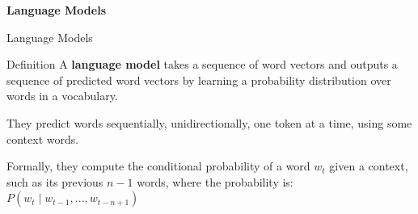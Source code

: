 
\begin{frame}{}
    \centering\large\textbf{Language Models}
\end{frame}




\begin{frame}{Language Models}
      \small 
    
    \begin{definitionBlock}{Definition}
    A \alert{\textbf{language model}} takes a sequence of word vectors and outputs a sequence of predicted word vectors by learning a probability distribution over words in a vocabulary.
    
    They predict words sequentially, unidirectionally, one token at a time, using some context words. 
    
    
    \end{definitionBlock}
    
    Formally, they compute the conditional probability of a word $w_t$ given a context, such as its previous $n-1$ words, where the probability is: $P(w_t \; | \; w_{t-1}, ..., w_{t-n+1})$
    
\end{frame}





